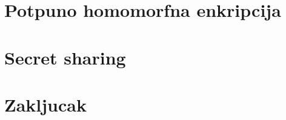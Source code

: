 \documentclass[12pt,a4paper]{report}
\begin{document}
\chapter{Potpuno homomorfna enkripcija}


\chapter{Secret sharing}


\chapter{Zakljucak}


\clearpage


\end{document}
